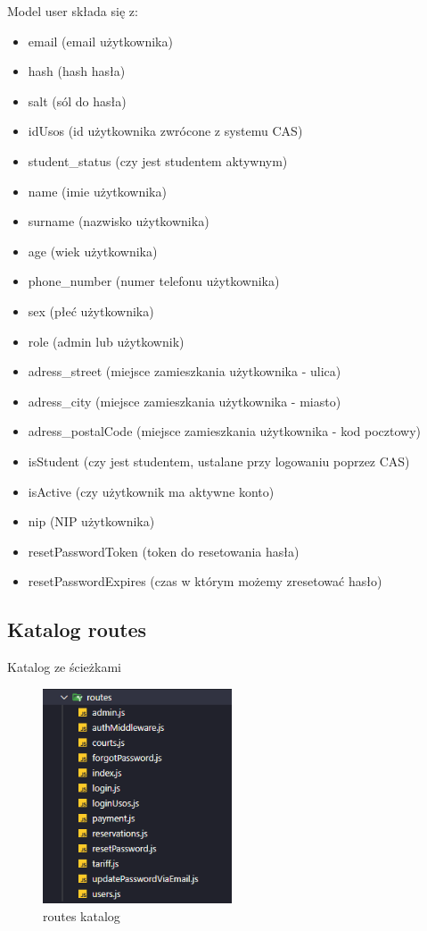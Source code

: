 \documentclass[titlepage]{article}
\begin{document}
Model user składa się z:
\begin{itemize}
  \item email (email użytkownika)
  \item hash (hash hasła)
  \item salt (sól do hasła)
  \item idUsos (id użytkownika zwrócone z systemu CAS)
  \item student\_status (czy jest studentem aktywnym)
  \item name (imie użytkownika)
  \item surname (nazwisko użytkownika)
  \item age (wiek użytkownika)
  \item phone\_number (numer telefonu użytkownika)
  \item sex (płeć użytkownika)
  \item role (admin lub użytkownik)
  \item adress\_street (miejsce zamieszkania użytkownika - ulica)
  \item adress\_city (miejsce zamieszkania użytkownika - miasto)
  \item adress\_postalCode (miejsce zamieszkania użytkownika - kod pocztowy)
  \item isStudent (czy jest studentem, ustalane przy logowaniu poprzez CAS)
  \item isActive (czy użytkownik ma aktywne konto)
  \item nip (NIP użytkownika)
  \item resetPasswordToken (token do resetowania hasła)
  \item resetPasswordExpires (czas w którym możemy zresetować hasło)
  
\end{itemize}

\newpage
\subsection{Katalog routes}
Katalog ze ścieżkami

\begin{figure}[h]
\centering
\includegraphics[width=0.5\textwidth]{routes.png}
\caption{routes katalog}
\label{fig:obrazek routes}
\end{figure}
\end{document}
